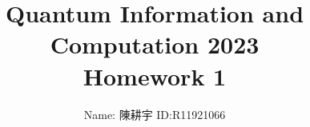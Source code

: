 




\title{\textbf{Quantum Information and Computation 2023}\\Homework 1}
\author{Name: 陳耕宇 \quad ID:R11921066}
\date{}



\begin{CJK*}{UTF8}{bsmi}
\maketitle
\end{CJK*}

